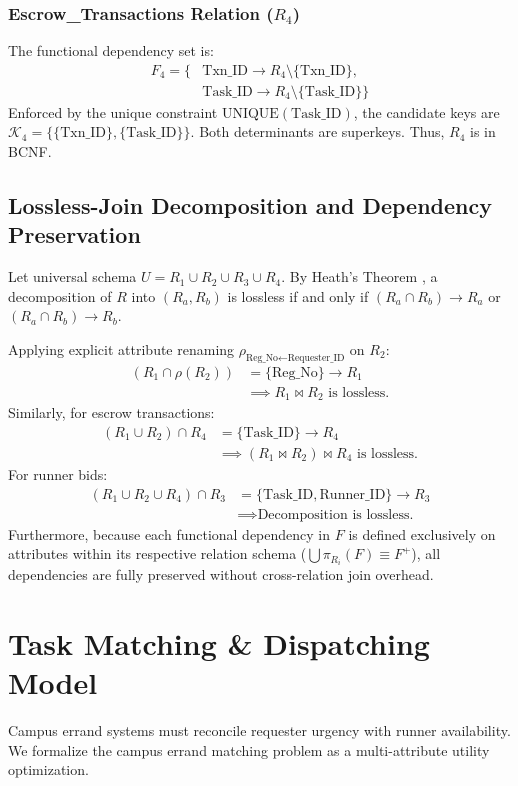 \documentclass[conference]{IEEEtran}
\begin{document}
\subsubsection{Escrow\_Transactions Relation ($R_4$)}
The functional dependency set is:
\begin{align*}
    F_4 = \{ & \text{Txn\_ID} \to R_4 \setminus \{\text{Txn\_ID}\}, \\
             & \text{Task\_ID} \to R_4 \setminus \{\text{Task\_ID}\} \}
\end{align*}
Enforced by the unique constraint $\text{UNIQUE}(\text{Task\_ID})$, the candidate keys are $\mathcal{K}_4 = \{\{\text{Txn\_ID}\}, \{\text{Task\_ID}\}\}$. Both determinants are superkeys. Thus, $R_4$ is in BCNF.

\subsection{Lossless-Join Decomposition and Dependency Preservation}
Let universal schema $U = R_1 \cup R_2 \cup R_3 \cup R_4$. By Heath's Theorem \cite{heath1971unacceptable}, a decomposition of $R$ into $(R_a, R_b)$ is lossless if and only if $(R_a \cap R_b) \to R_a$ or $(R_a \cap R_b) \to R_b$.

Applying explicit attribute renaming $\rho_{\text{Reg\_No} \leftarrow \text{Requester\_ID}}$ on $R_2$:
\begin{align}
    (R_1 \cap \rho(R_2)) &= \{\text{Reg\_No}\} \to R_1 \nonumber\\
    &\implies R_1 \bowtie R_2 \text{ is lossless.}
\end{align}
Similarly, for escrow transactions:
\begin{align}
    (R_1 \cup R_2) \cap R_4 &= \{\text{Task\_ID}\} \to R_4 \nonumber\\
    &\implies (R_1 \bowtie R_2) \bowtie R_4 \text{ is lossless.}
\end{align}
For runner bids:
\begin{align}
    (R_1 \cup R_2 \cup R_4) \cap R_3 &= \{\text{Task\_ID}, \text{Runner\_ID}\} \to R_3 \nonumber\\
    &\implies \text{Decomposition is lossless.}
\end{align}
Furthermore, because each functional dependency in $F$ is defined exclusively on attributes within its respective relation schema ($\bigcup \pi_{R_i}(F) \equiv F^+$), all dependencies are fully preserved without cross-relation join overhead.

\section{Task Matching \& Dispatching Model}
Campus errand systems must reconcile requester urgency with runner availability. We formalize the campus errand matching problem as a multi-attribute utility optimization.
\end{document}
